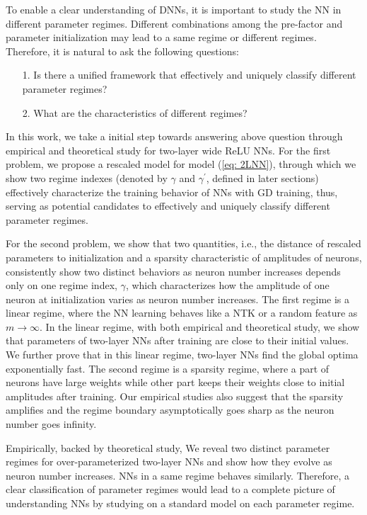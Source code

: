 \documentclass{article}
\begin{document}
To enable a clear understanding of DNNs, it is important to study the NN in different parameter regimes. Different combinations among the pre-factor and parameter initialization may lead to a same regime or different regimes. Therefore, it is natural to ask the following questions:
\begin{itemize}
    \item[1.] Is there a unified framework that effectively and uniquely classify different parameter regimes?
    \item[2.] What are the characteristics of different regimes?
\end{itemize}

In this work, we take a initial step towards answering above question through empirical and theoretical study for two-layer wide ReLU NNs. For the first problem, we propose a rescaled model for model (\ref{eq: 2LNN}), through which we show two regime indexes (denoted by $\gamma$ and $\gamma^{\prime}$, defined in later sections) effectively characterize the training behavior of NNs with GD training, thus, serving as potential candidates to effectively and uniquely classify different parameter regimes.

For the second problem, we show that two quantities, i.e., the distance of rescaled parameters to initialization and a sparsity characteristic of amplitudes of neurons, consistently show two distinct behaviors as neuron number increases depends only on one regime index, $\gamma$, which characterizes how the amplitude of one neuron at initialization varies as neuron number increases. The first regime is a linear regime, where the NN learning behaves like a NTK or a random feature as $m\rightarrow \infty$. In the linear regime,  with both empirical and theoretical study, we show that  parameters of two-layer NNs after training are close to their initial values. We further prove that in this linear regime, two-layer NNs find the global optima exponentially fast. The second regime is a sparsity regime, where a part of neurons have large weights while other part keeps their weights close to initial amplitudes after training. Our empirical studies also suggest that the sparsity amplifies and the regime boundary asymptotically goes sharp as the neuron number goes infinity.

Empirically, backed by theoretical study, We reveal two distinct parameter regimes for over-parameterized two-layer NNs and show how they evolve as neuron number increases. NNs in a same regime behaves similarly. Therefore, a clear classification of parameter regimes would lead to a complete picture of understanding NNs by studying on a standard model on each parameter regime.
\end{document}
